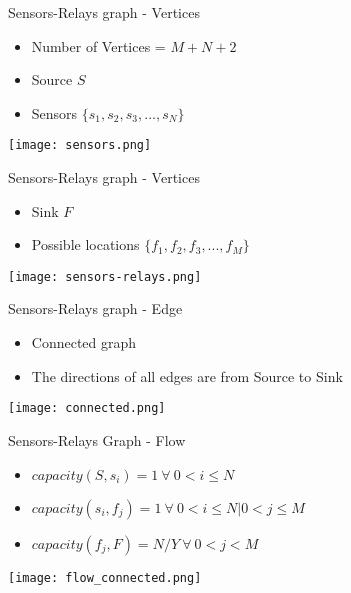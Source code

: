 \documentclass[main.tex]{subfiles}
\begin{document}
\begin{frame}{Sensors-Relays graph - Vertices}
\begin{itemize}
\item Number of Vertices = $M + N + 2$
\item Source $S$
\item Sensors $\{s_1, s_2, s_3, ..., s_N\}$
\end{itemize}

\begin{center}
\texttt{[image: sensors.png]}
\end{center}
\end{frame}

\begin{frame}{Sensors-Relays graph - Vertices}
\begin{itemize}
\item Sink $F$
\item Possible locations $\{f_1, f_2, f_3,..., f_M\}$\\
\end{itemize}
\begin{center}
\texttt{[image: sensors-relays.png]}
\end{center}
\end{frame}

\begin{frame}{Sensors-Relays graph - Edge}
\begin{itemize}
\item Connected graph
\item The directions of all edges are from Source to Sink
\end{itemize}
\begin{center}
\texttt{[image: connected.png]}
\end{center}
\end{frame}

\begin{frame}{Sensors-Relays Graph - Flow}
\begin{itemize}
\item $capacity(S, s_i) = 1 ~ \forall ~ 0 < i \le N$
\item $capacity(s_i, f_j) = 1 ~  \forall ~ 0 < i \le N | 0 < j \le M$
\item $capacity(f_j, F) =  N/Y ~ \forall ~ 0 < j < M$
\end{itemize}

\begin{center}
\texttt{[image: flow\_connected.png]}
\end{center}
\end{frame}
\end{document}
